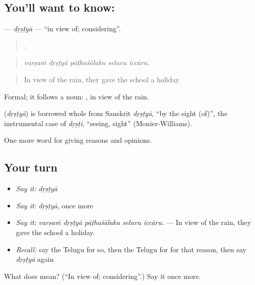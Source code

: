 \subsection*{You'll want to know: }
\textbf{} — \emph{dṛṣṭyā} — \textquotedblleft{}in view of; considering\textquotedblright{}.

\begin{quote}
    .
\end{quote}

\begin{quote}
\emph{varṣaṁ dṛṣṭyā pāṭhaśālaku selavu iccāru.}
\end{quote}

\begin{quote}
In view of the rain, they gave the school a holiday.
\end{quote}

Formal; it follows a noun:  , in view of the rain.

\begin{cousinweb}
\textbf{} (\emph{dṛṣṭyā}) is borrowed whole from Sanskrit \emph{dṛṣṭyā}, \textquotedblleft{}by the sight (of)\textquotedblright{}, the instrumental case of \emph{dṛṣṭi}, \textquotedblleft{}seeing, sight\textquotedblright{} (Monier-Williams).
\end{cousinweb}

\begin{grammarlens}[title={What you've built}]
One more word for giving reasons and opinions.
\end{grammarlens}

\subsection*{Your turn}
\begin{itemize}
\raggedright
  \item \emph{Say it:} \emph{dṛṣṭyā}
  \item \emph{Say it:} \emph{dṛṣṭyā}, once more
  \item \emph{Say it:} \emph{varṣaṁ dṛṣṭyā pāṭhaśālaku selavu iccāru.} — In view of the rain, they gave the school a holiday.
  \item \emph{Recall:} say the Telugu for so, then the Telugu for for that reason, then say \emph{dṛṣṭyā} again
\end{itemize}

\begin{tcolorbox}[breakable,colback=teal!4,colframe=teal!35!black,title={Before you move on}]
What does  mean? (\textquotedblleft{}In view of; considering\textquotedblright{}.) Say it once more.
\end{tcolorbox}
